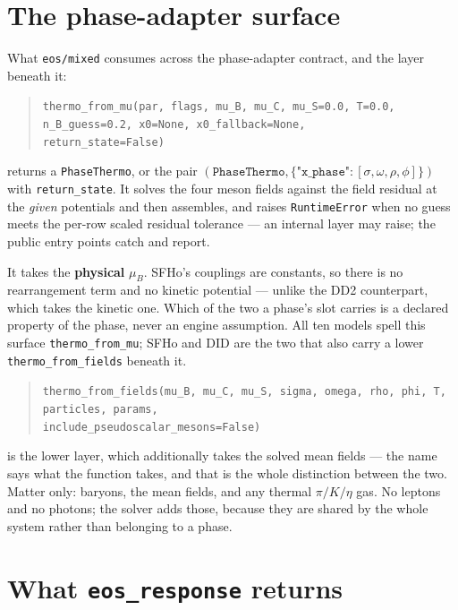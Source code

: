\documentclass[aps,prc,onecolumn,superscriptaddress,nofootinbib,10pt]{revtex4-2}
\newcommand{\muB}{\mu_B}
\begin{document}
\section{The phase-adapter surface}
\label{sec:adapter}

What \texttt{eos/mixed} consumes across the phase-adapter contract, and the
layer beneath it:
%
\begin{quote}
\texttt{thermo\_from\_mu(par, flags, mu\_B, mu\_C, mu\_S=0.0, T=0.0,\\
\phantom{thermo\_from\_mu(}n\_B\_guess=0.2, x0=None, x0\_fallback=None,\\
\phantom{thermo\_from\_mu(}return\_state=False)}
\end{quote}
%
returns a \texttt{PhaseThermo}, or the pair
$(\texttt{PhaseThermo}, \{\texttt{"x\_phase"}: [\sigma, \omega, \rho, \phi]\})$
with \texttt{return\_state}. It solves the four meson fields against the field
residual at the \emph{given} potentials and then assembles, and raises
\texttt{RuntimeError} when no guess meets the per-row scaled residual
tolerance --- an internal layer may raise; the public entry points catch and
report.

It takes the \textbf{physical} $\muB$. SFHo's couplings are constants, so
there is no rearrangement term and no kinetic potential --- unlike the DD2
counterpart, which takes the kinetic one. Which of the two a phase's slot
carries is a declared property of the phase, never an engine assumption. All ten
models spell this surface \texttt{thermo\_from\_mu}; SFHo and DID are the two
that also carry a lower \texttt{thermo\_from\_fields} beneath it.
%
\begin{quote}
\texttt{thermo\_from\_fields(mu\_B, mu\_C, mu\_S, sigma, omega, rho, phi, T,\\
\phantom{thermo\_from\_fields(}particles, params,\\
\phantom{thermo\_from\_fields(}include\_pseudoscalar\_mesons=False)}
\end{quote}
%
is the lower layer, which additionally takes the solved mean fields --- the
name says what the function takes, and that is the whole distinction between
the two. Matter only: baryons, the mean fields, and any thermal $\pi/K/\eta$
gas. No leptons and no photons; the solver adds those, because they are shared
by the whole system rather than belonging to a phase.

\section{What \texttt{eos\_response} returns}
\label{sec:response}
\end{document}
